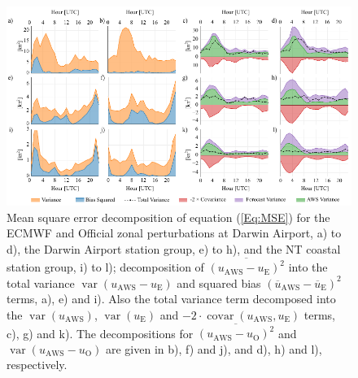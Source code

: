 \documentclass{ametsoc}
\DeclareMathOperator{\covar}{covar}
\DeclareMathOperator{\var}{var}
\begin{document}
\begin{figure}
\centering
\includegraphics[width=39pc]{error_decomp.pdf}
\caption{Mean square error decomposition of equation (\ref{Eq:MSE}) for the ECMWF and Official zonal perturbations at Darwin Airport, a) to d), the Darwin Airport station group, e) to h), and the NT coastal station group, i) to l); decomposition of $\overline{\left(u_\text{AWS} - u_\text{E}\right)^2}$ into the total variance $\var\left(u_\text{AWS} - u_\text{E}\right)$ and squared bias $\left(\overline{u}_\text{AWS} - \overline{u}_\text{E}\right)^2$ terms, a), e) and i). Also the total variance term decomposed into the $\var\left(u_\text{AWS}\right)$, $\var\left(u_\text{E}\right)$ and  $- 2 \cdot \covar\left(u_\text{AWS}, u_\text{E}\right)$ terms, c), g) and k). The decompositions for $\overline{\left(u_\text{AWS} - u_\text{O}\right)^2}$ and $\var\left(u_\text{AWS} - u_\text{O}\right)$ are given in b), f) and j), and d), h) and l), respectively.}
\label{Fig:error_decomp}
\end{figure}
\end{document}
